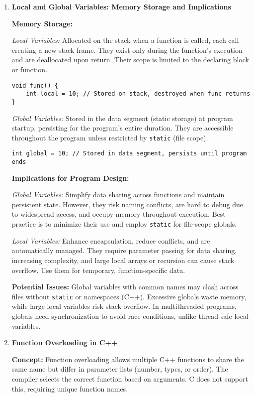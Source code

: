 \documentclass[a4paper,12pt]{article}
\begin{document}
\begin{enumerate}
\item \textbf{Local and Global Variables: Memory Storage and Implications}

\textbf{Memory Storage:}

\textit{Local Variables:} Allocated on the stack when a function is called, each call creating a new stack frame. They exist only during the function’s execution and are deallocated upon return. Their scope is limited to the declaring block or function.

\begin{lstlisting}
void func() {
    int local = 10; // Stored on stack, destroyed when func returns
}
\end{lstlisting}

\textit{Global Variables:} Stored in the data segment (static storage) at program startup, persisting for the program’s entire duration. They are accessible throughout the program unless restricted by \texttt{static} (file scope).

\begin{lstlisting}
int global = 10; // Stored in data segment, persists until program ends
\end{lstlisting}

\textbf{Implications for Program Design:}

\textit{Global Variables:} Simplify data sharing across functions and maintain persistent state. However, they risk naming conflicts, are hard to debug due to widespread access, and occupy memory throughout execution. Best practice is to minimize their use and employ \texttt{static} for file-scope globals.

\textit{Local Variables:} Enhance encapsulation, reduce conflicts, and are automatically managed. They require parameter passing for data sharing, increasing complexity, and large local arrays or recursion can cause stack overflow. Use them for temporary, function-specific data.

\textbf{Potential Issues:} Global variables with common names may clash across files without \texttt{static} or namespaces (C++). Excessive globals waste memory, while large local variables risk stack overflow. In multithreaded programs, globals need synchronization to avoid race conditions, unlike thread-safe local variables.

\item \textbf{Function Overloading in C++}

\textbf{Concept:} Function overloading allows multiple C++ functions to share the same name but differ in parameter lists (number, types, or order). The compiler selects the correct function based on arguments. C does not support this, requiring unique function names.


\end{enumerate}
\end{document}
